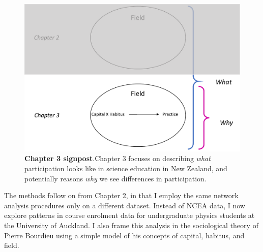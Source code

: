 \begin{figure}[h]
    \centering
    \includegraphics[width = \textwidth]{C3 - Bourdieu Networks/Thesis_structure_guide_chapter3.pdf}
    \caption{\textbf{Chapter 3 signpost}.Chapter 3 focuses on describing \textit{what} participation looks like in science education in New Zealand, and potentially reasons \textit{why} we see differences in participation. }
    
    \label{fig:Thesis_structure_c3}
\end{figure}
The methods follow on from Chapter 2, in that I employ the same network analysis procedures only on a different dataset. Instead of NCEA data, I now explore patterns in course enrolment data for undergraduate physics students at the University of Auckland. I also frame this analysis in the sociological theory of Pierre Bourdieu using a simple model of his concepts of capital, habitus, and field. 

